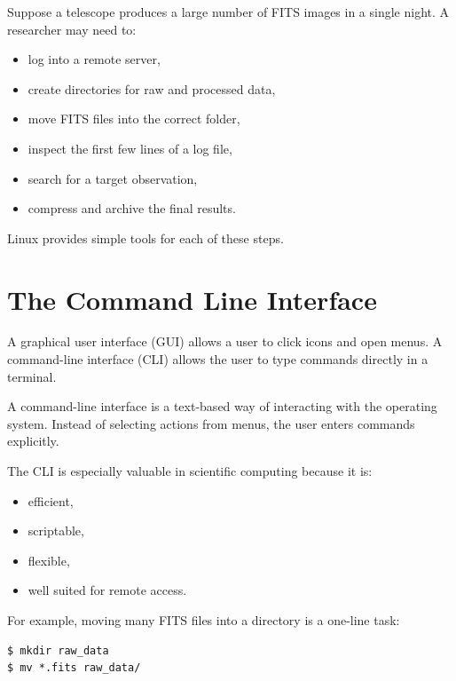 \begin{examplebox}
Suppose a telescope produces a large number of FITS images in a single
night. A researcher may need to:

\begin{itemize}
\item log into a remote server,
\item create directories for raw and processed data,
\item move FITS files into the correct folder,
\item inspect the first few lines of a log file,
\item search for a target observation,
\item compress and archive the final results.
\end{itemize}

Linux provides simple tools for each of these steps.
\end{examplebox}

\section{The Command Line Interface}

A graphical user interface (GUI) allows a user to click icons and open
menus. A command-line interface (CLI) allows the user to type commands
directly in a terminal.

\begin{defbox}
A command-line interface is a text-based way of interacting with the
operating system. Instead of selecting actions from menus, the user
enters commands explicitly.
\end{defbox}

The CLI is especially valuable in scientific computing because it is:

\begin{itemize}
\item efficient,
\item scriptable,
\item flexible,
\item well suited for remote access.
\end{itemize}

For example, moving many FITS files into a directory is a one-line task:

\begin{lstlisting}
$ mkdir raw_data
$ mv *.fits raw_data/
\end{lstlisting}

